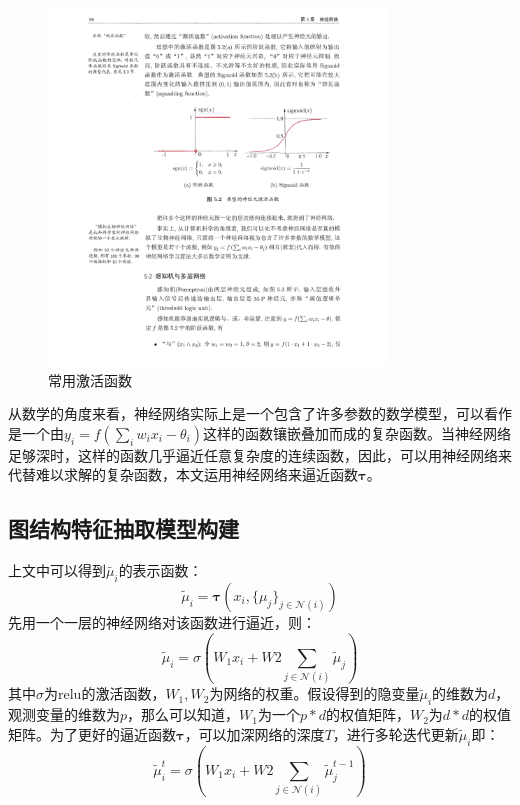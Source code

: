 \begin{figure}[htbp]
	\begin{center}
		\includegraphics[width=0.8\textwidth]{figures//3.pdf}
		\caption{常用激活函数}
		\label{fig:5-4}
	\end{center}
\end{figure}
\par 从数学的角度来看，神经网络实际上是一个包含了许多参数的数学模型，可以看作是一个由$y_i = f(\sum_i w_ix_i-\theta_i)$这样的函数镶嵌叠加而成的复杂函数。当神经网络足够深时，这样的函数几乎逼近任意复杂度的连续函数，因此，可以用神经网络来代替难以求解的复杂函数，本文运用神经网络来逼近函数$\boldsymbol{\tau}$。
\subsection{图结构特征抽取模型构建}
上文中可以得到$\tilde{\mu_i}$的表示函数：
\begin{equation}
\tilde{\mu}_i = \boldsymbol{\tau} (x_i, \{\mu_j\}_{j\in \mathcal{N}(i)})
\end{equation}
先用一个一层的神经网络对该函数进行逼近，则：
\begin{equation}
\tilde{\mu}_i = \sigma(W_1x_i + W2\sum_{j\in \mathcal{N}(i)}\tilde{\mu}_j)
\end{equation}
其中$\sigma$为relu的激活函数，$W_1, W_2$为网络的权重。假设得到的隐变量$\tilde{\mu}_i$的维数为$d$，观测变量的维数为$p$，那么可以知道，$W_1$为一个$p*d$的权值矩阵，$W_2$为$d*d$的权值矩阵。为了更好的逼近函数$\boldsymbol{\tau}$，可以加深网络的深度$T$，进行多轮迭代更新$\tilde{\mu}_i$即：
\begin{equation}
\tilde{\mu}_i^t = \sigma(W_1x_i + W2\sum_{j\in \mathcal{N}(i)}\tilde{\mu}_j^{t-1})
\end{equation}


